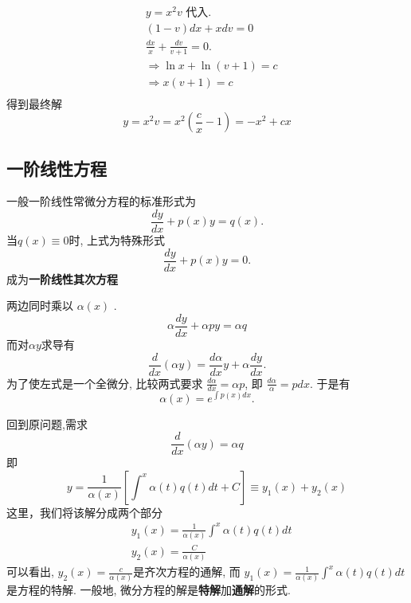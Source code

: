 $$
\begin{aligned}
& y=x^2 v \text { 代入. } \\
& (1-v) d x+x d v=0 \\
& \frac{d x}{x}+\frac{d v}{v+1}=0 . \\
& \Rightarrow \ln x+\ln (v+1)=c \\
& \Rightarrow x(v+1)=c \\
\end{aligned}
$$
得到最终解
\[
    y=x^2 v=x^2\left(\frac{c}{x}-1\right) = -x^2+c x 
\]

\subsection{一阶线性方程}
一般一阶线性常微分方程的标准形式为
\begin{equation}
    \frac{d y}{d x}+p(x) y=q(x).
\end{equation}
当$q(x) \equiv 0$时, 上式为特殊形式
\begin{equation}
    \frac{d y}{d x}+p(x) y = 0.
\end{equation}
成为\textbf{一阶线性其次方程}

两边同时乘以 $\alpha(x)$ .
\begin{equation}
     \alpha \frac{d y}{d x}+\alpha p y=\alpha q 
\end{equation}
而对$\alpha y$求导有
\begin{equation}
    \frac{d}{d x}(\alpha y)=\frac{d \alpha}{d x} y+\alpha \frac{d y}{d x} .
\end{equation}
为了使左式是一个全微分, 比较两式要求
$\frac{d \alpha}{d x}=\alpha p $, 即 $\frac{d \alpha}{\alpha}=p d x $. 于是有
\begin{equation}
    \alpha(x)=e^{\int p(x) d x}.
\end{equation}

回到原问题,需求
$$\frac{d}{d x}(\alpha y)=\alpha q $$
即
\begin{equation}
    y=\frac{1}{\alpha(x)}\left[\int^x \alpha(t) q(t) dt+C\right] \equiv y_1(x)+y_2(x)
\end{equation}
这里，我们将该解分成两个部分
\begin{equation}
\begin{aligned}
& y_1(x)=\frac{1}{\alpha(x)} \int^x \alpha(t) q(t) d t \\
& y_2(x)=\frac{C}{\alpha(x)}
\end{aligned}
\end{equation}
可以看出, $y_2(x)=\frac{c}{\alpha(x)}$是齐次方程的通解,
而 $y_1(x)=\frac{1}{\alpha(x)} \int^x \alpha(t) q(t) d t$是方程的特解.
一般地, 微分方程的解是\textbf{特解}加\textbf{通解}的形式.

